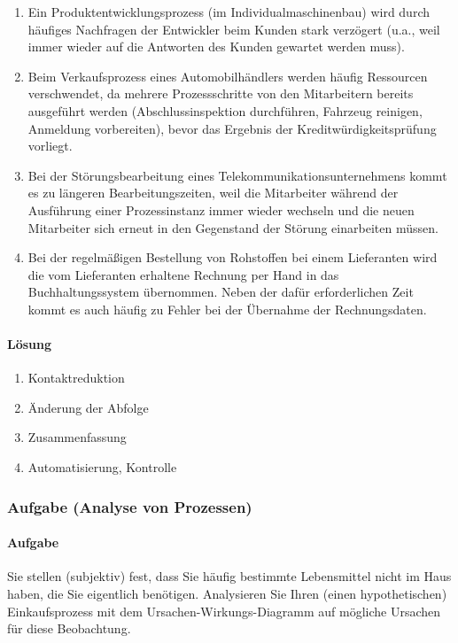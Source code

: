     \begin{enumerate}[label=\alph*)]
        \item Ein Produktentwicklungsprozess (im Individualmaschinenbau) wird durch häufiges Nachfragen der Entwickler beim Kunden stark verzögert (u.a., weil immer wieder auf die Antworten des Kunden gewartet werden muss).
        \item Beim Verkaufsprozess eines Automobilhändlers werden häufig Ressourcen verschwendet, da mehrere Prozessschritte von den Mitarbeitern bereits ausgeführt werden (Abschlussinspektion durchführen, Fahrzeug reinigen, Anmeldung vorbereiten), bevor das Ergebnis der Kreditwürdigkeitsprüfung vorliegt.
        \item Bei der Störungsbearbeitung eines Telekommunikationsunternehmens kommt es zu längeren Bearbeitungszeiten, weil die Mitarbeiter während der Ausführung einer Prozessinstanz immer wieder wechseln und die neuen Mitarbeiter sich erneut in den Gegenstand der Störung einarbeiten müssen.
        \item Bei der regelmäßigen Bestellung von Rohstoffen bei einem Lieferanten wird die vom Lieferanten erhaltene Rechnung per Hand in das Buchhaltungssystem übernommen. Neben der dafür erforderlichen Zeit kommt es auch häufig zu Fehler bei der Übernahme der Rechnungsdaten.
    \end{enumerate}

\paragraph*{Lösung}
    \begin{enumerate}[label=\alph*)]
        \item Kontaktreduktion
        \item Änderung der Abfolge
        \item Zusammenfassung
        \item Automatisierung, Kontrolle
    \end{enumerate}

\subsubsection*{Aufgabe (Analyse von Prozessen)}
\paragraph*{Aufgabe}
    Sie stellen (subjektiv) fest, dass Sie häufig bestimmte Lebensmittel nicht im Haus haben, die Sie eigentlich benötigen. Analysieren Sie Ihren (einen hypothetischen) Einkaufsprozess mit dem Ursachen-Wirkungs-Diagramm auf mögliche Ursachen für diese Beobachtung.
